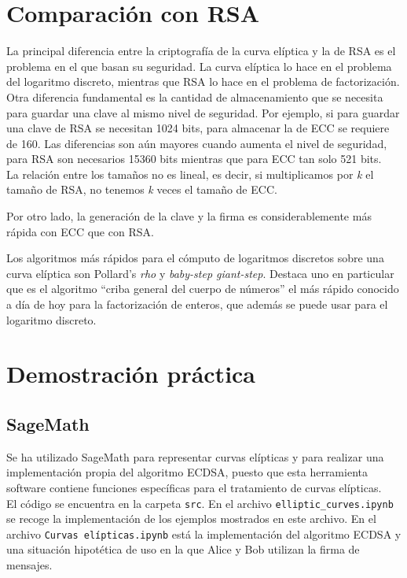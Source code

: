 \documentclass[11pt]{article}
\begin{document}
\section{Comparación con RSA}
\label{sec:RSA}
La principal diferencia entre la criptografía de la curva elíptica y la de RSA es el problema en el que basan su seguridad. La curva elíptica lo hace en el problema del logaritmo discreto, mientras que RSA lo hace en el problema de factorización. Otra diferencia fundamental es la cantidad de almacenamiento que se necesita para guardar una clave al mismo nivel de seguridad. Por ejemplo, si para guardar una clave de RSA se necesitan 1024 bits, para almacenar la de ECC se requiere de 160. Las diferencias son aún mayores cuando aumenta el nivel de seguridad, para RSA son necesarios 15360 bits mientras que para ECC tan solo 521 bits.\\ %

La relación entre los tamaños no es lineal, es decir, si multiplicamos por \textit{k} el tamaño de RSA, no tenemos \textit{k} veces el tamaño de ECC.

Por otro lado, la generación de la clave y la firma es considerablemente más rápida con ECC que con RSA.

Los algoritmos más rápidos para el cómputo de logaritmos discretos sobre una curva elíptica son Pollard's \textit{rho} y \textit{baby-step giant-step}. Destaca uno en particular que es el algoritmo ``criba general del cuerpo de números'' el más rápido conocido a día de hoy para la factorización de enteros, que además se puede usar para el logaritmo discreto.

\section{Demostración práctica}
\label{sec:semo}
\subsection{SageMath}
Se ha utilizado SageMath para representar curvas elípticas y para realizar una implementación propia del algoritmo ECDSA, puesto que esta herramienta software contiene funciones específicas para el tratamiento de curvas elípticas.\\
El código se encuentra en la carpeta \texttt{src}. En el archivo \texttt{elliptic\_curves.ipynb} se recoge la implementación de los ejemplos mostrados en este archivo. En el archivo \texttt{Curvas elípticas.ipynb} está la implementación del algoritmo ECDSA y una situación hipotética de uso en la que Alice y Bob utilizan la firma de mensajes.
\end{document}
